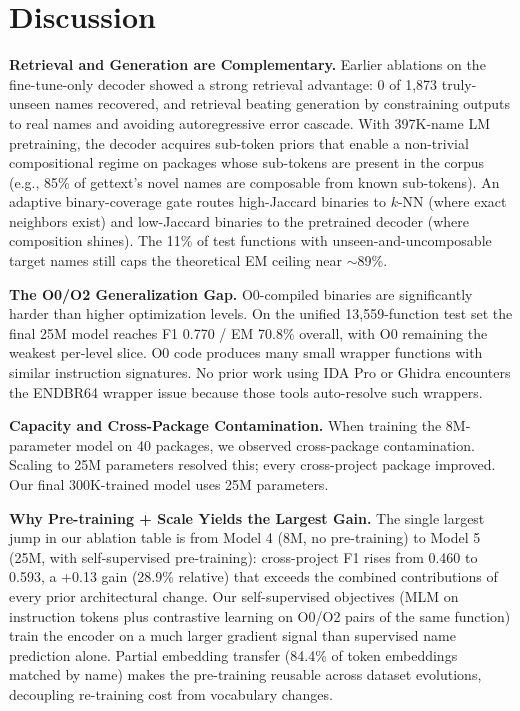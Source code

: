\documentclass[sigconf,nonacm]{acmart}
\begin{document}
\section{Discussion}
\label{sec:discussion}

\textbf{Retrieval and Generation are Complementary.}
Earlier ablations on the fine-tune-only decoder showed a strong retrieval advantage: 0 of 1,873 truly-unseen names recovered, and retrieval beating generation by constraining outputs to real names and avoiding autoregressive error cascade. With 397K-name LM pretraining, the decoder acquires sub-token priors that enable a non-trivial compositional regime on packages whose sub-tokens are present in the corpus (e.g., 85\% of gettext's novel names are composable from known sub-tokens). An adaptive binary-coverage gate routes high-Jaccard binaries to $k$-NN (where exact neighbors exist) and low-Jaccard binaries to the pretrained decoder (where composition shines). The 11\% of test functions with unseen-and-uncomposable target names still caps the theoretical EM ceiling near ${\sim}$89\%.

\textbf{The O0/O2 Generalization Gap.}
O0-compiled binaries are significantly harder than higher optimization levels. On the unified 13,559-function test set the final 25M model reaches F1 0.770 / EM 70.8\% overall, with O0 remaining the weakest per-level slice. O0 code produces many small wrapper functions with similar instruction signatures. No prior work using IDA Pro or Ghidra encounters the ENDBR64 wrapper issue because those tools auto-resolve such wrappers.

\textbf{Capacity and Cross-Package Contamination.}
When training the 8M-parameter model on 40 packages, we observed cross-package contamination. Scaling to 25M parameters resolved this; every cross-project package improved. Our final 300K-trained model uses 25M parameters.

\textbf{Why Pre-training + Scale Yields the Largest Gain.}
The single largest jump in our ablation table is from Model 4 (8M, no pre-training) to Model 5 (25M, with self-supervised pre-training): cross-project F1 rises from 0.460 to 0.593, a +0.13 gain (28.9\% relative) that exceeds the combined contributions of every prior architectural change. Our self-supervised objectives (MLM on instruction tokens plus contrastive learning on O0/O2 pairs of the same function) train the encoder on a much larger gradient signal than supervised name prediction alone. Partial embedding transfer (84.4\% of token embeddings matched by name) makes the pre-training reusable across dataset evolutions, decoupling re-training cost from vocabulary changes.
\end{document}
